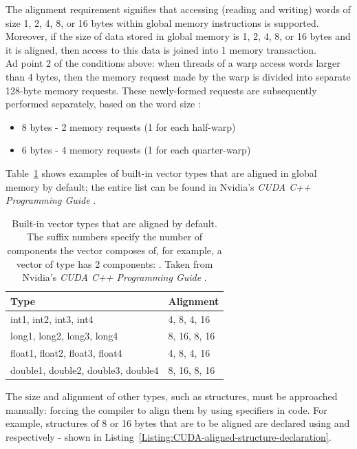 The alignment requirement signifies that accessing (reading and writing) words of size 1, 2, 4, 8, or 16 bytes within global memory instructions is supported. Moreover, if the size of data stored in global memory is 1, 2, 4, 8, or 16 bytes and it is aligned, then access to this data is joined into 1 memory transaction. \\
Ad point 2 of the conditions above: when threads of a warp access words larger than 4 bytes, then the memory request made by the warp is divided into separate 128-byte memory requests. These newly-formed requests are subsequently performed separately, based on the word size \cite{NVIDIAMay2022}:

\begin{itemize}
	\item 8 bytes - 2 memory requests (1 for each half-warp)
	\item 6 bytes - 4 memory requests (1 for each quarter-warp)
\end{itemize}

Table~\ref{Table:CUDA-built-in-aligned-vector-types} shows examples of built-in vector types that are aligned in global memory by default; the entire list can be found in Nvidia's \emph{CUDA C++ Programming Guide} \cite{NVIDIAMay2022}.

\begin{table}[h!]
	\centering
	\renewcommand{\arraystretch}{1.5}
	\begin{tabular}{ |l|l| } 
		\hline
		\textbf{Type} & \textbf{Alignment} \\
		\hline
		int1, int2, int3, int4 & 4, 8, 4, 16 \\
		long1, long2, long3, long4 & 8, 16, 8, 16 \\
		float1, float2, float3, float4 & 4, 8, 4, 16 \\
		double1, double2, double3, double4 & 8, 16, 8, 16 \\
		\hline
	\end{tabular}
	\caption{Built-in vector types that are aligned by default. The suffix numbers specify the number of components the vector composes of, for example, a vector of type  has 2 components: . Taken from Nvidia's \emph{CUDA C++ Programming Guide} \cite{NVIDIAMay2022}.}
	\label{Table:CUDA-built-in-aligned-vector-types}
\end{table}

The size and alignment of other types, such as structures, must be approached manually: forcing the compiler to align them by using specifiers in code. For example, structures of 8 or 16 bytes that are to be aligned are declared using  and  respectively - shown in Listing~\ref{Listing:CUDA-aligned-structure-declaration}.

